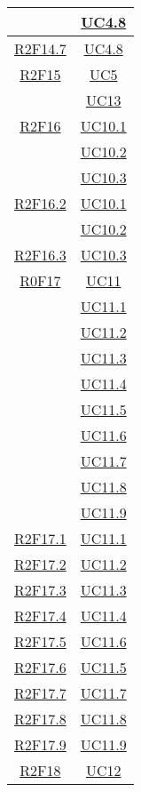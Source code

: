 \begin{longtable}{|c|c|}
& \hyperlink{UC4.8}{UC4.8}\\
\hline
\hyperlink{R2F14.7}{R2F14.7} & \hyperlink{UC4.8}{UC4.8}\\
\hline
\hyperlink{R2F15}{R2F15} & \hyperlink{UC5}{UC5}\\
& \hyperlink{UC13}{UC13}\\
\hline
\hyperlink{R2F16}{R2F16} & \hyperlink{UC10.1}{UC10.1}\\
& \hyperlink{UC10.2}{UC10.2}\\
& \hyperlink{UC10.3}{UC10.3}\\
\hline
\hyperlink{R2F16.2}{R2F16.2} & \hyperlink{UC10.1}{UC10.1}\\
& \hyperlink{UC10.2}{UC10.2}\\
\hline
\hyperlink{R2F16.3}{R2F16.3} & \hyperlink{UC10.3}{UC10.3}\\
\hline
\hyperlink{R0F17}{R0F17} & \hyperlink{UC11}{UC11}\\
& \hyperlink{UC11.1}{UC11.1}\\
& \hyperlink{UC11.2}{UC11.2}\\
& \hyperlink{UC11.3}{UC11.3}\\
& \hyperlink{UC11.4}{UC11.4}\\
& \hyperlink{UC11.5}{UC11.5}\\
& \hyperlink{UC11.6}{UC11.6}\\
& \hyperlink{UC11.7}{UC11.7}\\
& \hyperlink{UC11.8}{UC11.8}\\
& \hyperlink{UC11.9}{UC11.9}\\
\hline
\hyperlink{R2F17.1}{R2F17.1} & \hyperlink{UC11.1}{UC11.1}\\
\hline
\hyperlink{R2F17.2}{R2F17.2} & \hyperlink{UC11.2}{UC11.2}\\
\hline
\hyperlink{R2F17.3}{R2F17.3} & \hyperlink{UC11.3}{UC11.3}\\
\hline
\hyperlink{R2F17.4}{R2F17.4} & \hyperlink{UC11.4}{UC11.4}\\
\hline
\hyperlink{R2F17.5}{R2F17.5} & \hyperlink{UC11.6}{UC11.6}\\
\hline
\hyperlink{R2F17.6}{R2F17.6} & \hyperlink{UC11.5}{UC11.5}\\
\hline
\hyperlink{R2F17.7}{R2F17.7} & \hyperlink{UC11.7}{UC11.7}\\
\hline
\hyperlink{R2F17.8}{R2F17.8} & \hyperlink{UC11.8}{UC11.8}\\
\hline
\hyperlink{R2F17.9}{R2F17.9} & \hyperlink{UC11.9}{UC11.9}\\
\hline
\hyperlink{R2F18}{R2F18} & \hyperlink{UC12}{UC12}\\

\end{longtable}
